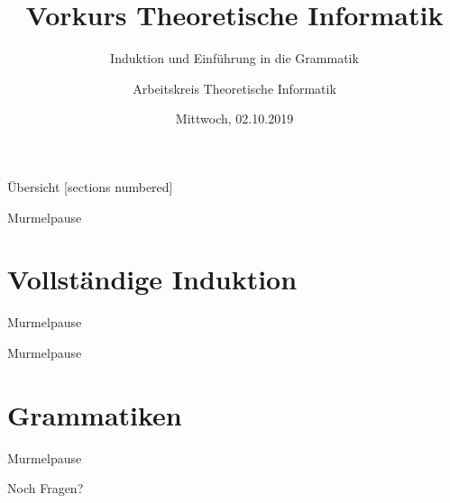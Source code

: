 

\title{Vorkurs Theoretische Informatik}
\subtitle{Induktion und Einführung in die Grammatik}
\date{Mittwoch, 02.10.2019}
\author{Arbeitskreis Theoretische Informatik}



\maketitle

\begin{frame}[fragile]{Übersicht}
  [sections numbered]
  \tableofcontents%
\end{frame}

\begin{frame}[standout]
  Murmelpause
\end{frame}

\section{Vollständige Induktion}



\begin{frame}[standout]
  Murmelpause
\end{frame}



\begin{frame}[standout]
  Murmelpause
\end{frame}

\section{Grammatiken}



\begin{frame}[standout]
  Murmelpause
\end{frame}



\begin{frame}[standout]
  Noch Fragen?
\end{frame}

